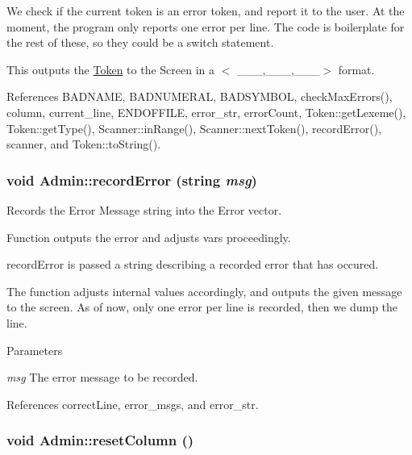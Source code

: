 We check if the current token is an error token, and report it to the user. At the moment, the program only reports one error per line. The code is boilerplate for the rest of these, so they could be a switch statement.

This outputs the \hyperlink{classToken}{Token} to the Screen in a $<$ \_\-\_\-\_\-,\_\-\_\-\_\-,\_\-\_\-\_\-$>$ format. 



References BADNAME, BADNUMERAL, BADSYMBOL, checkMaxErrors(), column, current\_\-line, ENDOFFILE, error\_\-str, errorCount, Token::getLexeme(), Token::getType(), Scanner::inRange(), Scanner::nextToken(), recordError(), scanner, and Token::toString().

\hypertarget{classAdmin_a6519bde7fd1ffd997a66987c2417d7bd}{
\subsubsection[{recordError}]{\setlength{\rightskip}{0pt plus 5cm}void Admin::recordError (string {\em msg})}}
\label{classAdmin_a6519bde7fd1ffd997a66987c2417d7bd}


Records the Error Message string into the Error vector. 

Function outputs the error and adjusts vars proceedingly.

recordError is passed a string describing a recorded error that has occured.

The function adjusts internal values accordingly, and outputs the given message to the screen. As of now, only one error per line is recorded, then we dump the line.


\begin{DoxyParams}{Parameters}
\item[{\em msg}]The error message to be recorded. \end{DoxyParams}


References correctLine, error\_\-msgs, and error\_\-str.

\hypertarget{classAdmin_a62813e5c17636eeef43524ad40cdaab8}{
\subsubsection[{resetColumn}]{\setlength{\rightskip}{0pt plus 5cm}void Admin::resetColumn ()}}
\label{classAdmin_a62813e5c17636eeef43524ad40cdaab8}


